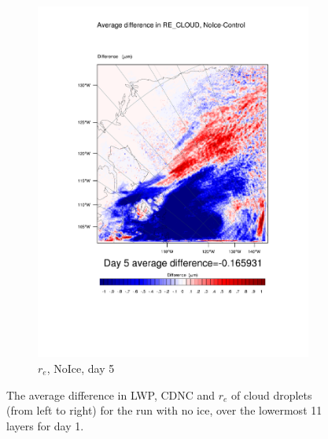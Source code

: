 \begin{figure}
\begin{subfigure}{0.32\textwidth}
		\includegraphics[width=\textwidth]{results/noice/diff_NoIce_RE_CLOUD_Day5.pdf}
		\caption{$r_e$, NoIce, day 5}
		\label{subfig:recloud_r2Day5}
	\end{subfigure}
\caption{The average difference in LWP, CDNC and $r_e$ of cloud droplets (from left to right) for the run with no ice, over the lowermost 11 layers for day 1.}
\label{fig:lwpcdncre_r2Day5}
\end{figure}
